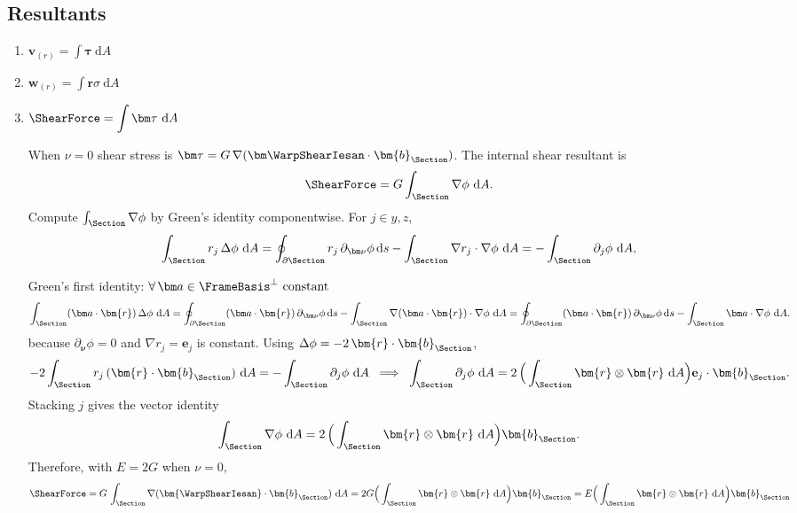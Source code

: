 \subsection{Resultants}


\begin{enumerate}

\item \(\bm{v}_{(r)} = \int \bm\tau\mathrm{~d}A\)
\item \(\displaystyle\bm{w}_{(r)} = \int \bm{r}\sigma\mathrm{~d}A\)
\item \(\ShearForce = \displaystyle\int\bm\tau\mathrm{~d}A\)
\begin{Quote}

When \(\nu=0\) shear stress is \(\bm\tau=G\,\nabla(\bm\WarpShearIesan\cdot\bm{b}_{\Section})\).
 The internal shear resultant is
  \[
  \ShearForce
  =G\int_{\Section}\nabla\phi\mathrm{~d}A.
  \]
  Compute \(\int_{\Section}\nabla\phi\) by Green’s identity componentwise.
  For \(j\in{y,z}\),
  \[
  \int_{\Section} r_j\,\Delta\phi\mathrm{~d}A
   = \oint_{\partial\Section} r_j\,\partial_{\bm\nu}\phi\,\mathrm{d}s
  -\int_{\Section}\nabla r_j\cdot\nabla\phi\mathrm{~d}A
   = -\int_{\Section}\partial_j\phi\mathrm{~d}A,
  \]

  Green's first identity: $\forall\,\bm a\in\FrameBasis^\perp\ \text{constant}$
  \begin{equation}
  \int_{\Section} (\bm a\cdot\bm{r})\,\Delta\phi\mathrm{~d}A
  =\oint_{\partial\Section} (\bm a\cdot\bm{r})\,\partial_{\bm\nu}\phi\,\mathrm{d}s
-\int_{\Section} \nabla(\bm a\cdot\bm{r})\cdot\nabla\phi\mathrm{~d}A
  =\oint_{\partial\Section} (\bm a\cdot\bm{r})\,\partial_{\bm\nu}\phi\,\mathrm{d}s
  -\int_{\Section} \bm a\cdot\nabla\phi\mathrm{~d}A.
  \label{eq:thm-green-1-vec}
  \end{equation}
  because \(\partial_{\bm\nu}\phi=0\) and \(\nabla r_j=\mathbf e_j\) is constant.
  Using \(\Delta\phi=-2\,\bm{r}\cdot\bm{b}_{\Section}\),
  \[
  -2\int_{\Section} r_j\,(\bm{r}\cdot\bm{b}_{\Section})\mathrm{~d}A
   = -\int_{\Section}\partial_j\phi\mathrm{~d}A
  \;\implies\;
  \int_{\Section}\partial_j\phi\mathrm{~d}A
   = 2\, \Big(\int_{\Section}\bm{r}\otimes\bm{r}\mathrm{~d}A\Big)\mathbf e_j\cdot\bm{b}_{\Section}.
  \]
  Stacking \(j\) gives the vector identity
  \[
  \int_{\Section}\nabla\phi\mathrm{~d}A
   = 2\,\Big(\int_{\Section}\bm{r}\otimes\bm{r}\mathrm{~d}A\Big)\bm{b}_{\Section}.
  \]
  Therefore, with \(E=2G\) when \(\nu=0\),
  \[
  \ShearForce
  =G\,\int_{\Section}\nabla(\bm{\WarpShearIesan}\cdot\bm{b}_{\Section})\mathrm{~d}A
  =2G\Big(\int_{\Section}\bm{r}\otimes\bm{r} \mathrm{~d}A\Big)\bm{b}_{\Section}
  =E\Big(\int_{\Section}\bm{r}\otimes\bm{r}\mathrm{~d}A\Big)\bm{b}_{\Section}
  \]
\end{Quote}


\end{enumerate}
